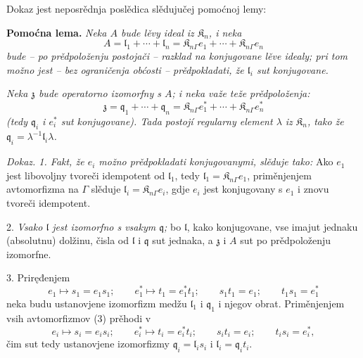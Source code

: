 \documentclass[11pt]{article}
\begin{document}
Dokaz jest neposrědnja poslědica slědujučej pomoćnoj lemy:

\textbf{Pomoćna lema.} \emph{Neka \(A\) bude lěvy ideal iz \(\mathfrak K_n\), i neka}
\[
A=\mathfrak l_1+\cdots+\mathfrak l_n
=\mathfrak K_{n\Gamma}e_1+\cdots+\mathfrak K_{n\Gamma}e_n
\]
\emph{bude -- po prědpoloženju postojači -- razklad na konjugovane lěve idealy; pri tom možno jest -- bez ograničenja obćosti -- prědpokladati, že \(\mathfrak l_i\) sut konjugovane.}

\emph{Neka \(\mathfrak z\) bude operatorno izomorfny s \(A\); i neka važe teže prědpoloženja:}
\[
\mathfrak z=\mathfrak q_1+\cdots+\mathfrak q_n
=\mathfrak K_{n\Gamma}e_1^*+\cdots+\mathfrak K_{n\Gamma}e_n^*
\]
\emph{(tedy \(\mathfrak q_i\) i \(e_i^*\) sut konjugovane). Tada postojí regularny element \(\lambda\) iz \(\mathfrak K_n\), tako že \(\mathfrak q_i=\lambda^{-1}\mathfrak l_i\lambda\).}

\emph{Dokaz. 1. Fakt, že \(e_i\) možno prědpokladati konjugovanymi, slěduje tako:} Ako \(e_1\) jest libovoljny tvoreči idempotent od \(\mathfrak l_1\), tedy \(\mathfrak l_1=\mathfrak K_{n\Gamma}e_1\), priměnjenjem avtomorfizma na \(\Gamma\) slěduje \(\mathfrak l_i=\mathfrak K_{n\Gamma}e_i\), gdje \(e_i\) jest konjugovany s \(e_1\) i znovu tvoreči idempotent.

2. \emph{Vsako \(\mathfrak l\) jest izomorfno s vsakym \(\mathfrak q\);} bo \(\mathfrak l\), kako konjugovane, vse imajut jednaku (absolutnu) dolžinu, čisla od \(\mathfrak l\) i \(\mathfrak q\) sut jednaka, a \(\mathfrak z\) i \(A\) sut po prědpoloženju izomorfne.

3. Priręđenjem
\[
\tag{3}
e_1\mapsto s_1=e_1s_1;\qquad
e_1^*\mapsto t_1=e_1^*t_1;\qquad
s_1t_1=e_1;\qquad
t_1s_1=e_1^*
\]
neka budu ustanovjene izomorfizm medžu \(\mathfrak l_1\) i \(\mathfrak q_1\) i njegov obrat. Priměnjenjem vsih avtomorfizmov (3) prěhodi v
\[
e_i\mapsto s_i=e_is_i;\qquad
e_i^*\mapsto t_i=e_i^*t_i;\qquad
s_it_i=e_i;\qquad
t_is_i=e_i^*,
\]
čim sut tedy ustanovjene izomorfizmy \(\mathfrak q_i=\mathfrak l_is_i\) i \(\mathfrak l_i=\mathfrak q_it_i\).
\end{document}
